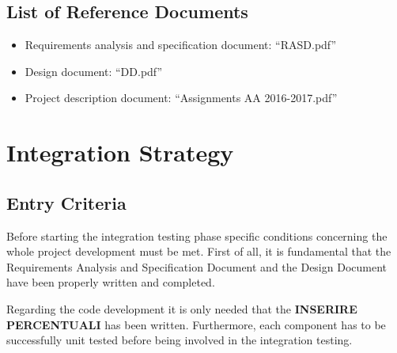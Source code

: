 \documentclass[english]{article}
\begin{document}
\subsection{List of Reference Documents}

\begin{itemize}
	\item{Requirements analysis and specification document: “RASD.pdf”}
	\item{Design document: “DD.pdf”}
	\item{Project description document: “Assignments AA 2016-2017.pdf”}
\end{itemize}

\section{Integration Strategy}

\subsection{Entry Criteria}

Before starting the integration testing phase specific conditions concerning the whole project development must be met.
First of all, it is fundamental that the Requirements Analysis and Specification Document and the Design Document have been properly written and completed.

Regarding the code development it is only needed that the \textbf{INSERIRE PERCENTUALI} has been written. Furthermore, each component has to be successfully unit tested before being involved in the integration testing.

\end{document}

